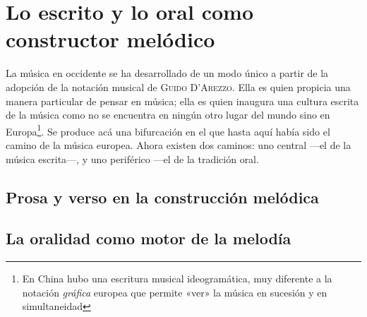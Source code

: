 \chapter{Lo escrito y lo oral como constructor melódico}
La música en occidente se ha desarrollado de un modo único a partir de la adopción de la notación musical de \textsc{Guido D'Arezzo}. Ella es quien propicia una manera particular de pensar en música; ella es quien inaugura una cultura escrita de la música como no se encuentra en ningún otro lugar del mundo sino en Europa\footnote{En China hubo una escritura musical ideogramática, muy diferente a la notación \emph{gráfica} europea que permite «ver» la música en sucesión y en simultaneidad}. Se produce acá una bifurcación en el que hasta aquí había sido el camino de la música europea. Ahora existen dos caminos: uno central ---el de la música escrita---, y uno periférico ---el de la tradición oral.

\section[Prosa y verso]{Prosa y verso en la construcción melódica}

\section{La oralidad como motor de la melodía}
